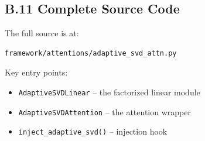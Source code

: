 \subsection{B.11 Complete Source Code}

The full source is at:

\begin{lstlisting}
framework/attentions/adaptive_svd_attn.py
\end{lstlisting}

Key entry points:
\begin{itemize}
\item \texttt{AdaptiveSVDLinear} -- the factorized linear module
\item \texttt{AdaptiveSVDAttention} -- the attention wrapper
\item \texttt{inject\_adaptive\_svd()} -- injection hook
\end{itemize}